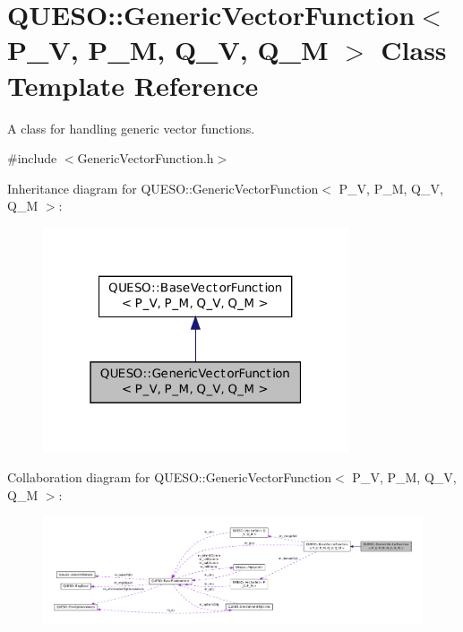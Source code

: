 \hypertarget{class_q_u_e_s_o_1_1_generic_vector_function}{\section{Q\-U\-E\-S\-O\-:\-:Generic\-Vector\-Function$<$ P\-\_\-\-V, P\-\_\-\-M, Q\-\_\-\-V, Q\-\_\-\-M $>$ Class Template Reference}
\label{class_q_u_e_s_o_1_1_generic_vector_function}
}


A class for handling generic vector functions.  




{\ttfamily \#include $<$Generic\-Vector\-Function.\-h$>$}



Inheritance diagram for Q\-U\-E\-S\-O\-:\-:Generic\-Vector\-Function$<$ P\-\_\-\-V, P\-\_\-\-M, Q\-\_\-\-V, Q\-\_\-\-M $>$\-:
\nopagebreak
\begin{figure}[H]
\begin{center}
\leavevmode
\includegraphics[width=256pt]{class_q_u_e_s_o_1_1_generic_vector_function__inherit__graph}
\end{center}
\end{figure}


Collaboration diagram for Q\-U\-E\-S\-O\-:\-:Generic\-Vector\-Function$<$ P\-\_\-\-V, P\-\_\-\-M, Q\-\_\-\-V, Q\-\_\-\-M $>$\-:
\nopagebreak
\begin{figure}[H]
\begin{center}
\leavevmode
\includegraphics[width=350pt]{class_q_u_e_s_o_1_1_generic_vector_function__coll__graph}
\end{center}
\end{figure}
